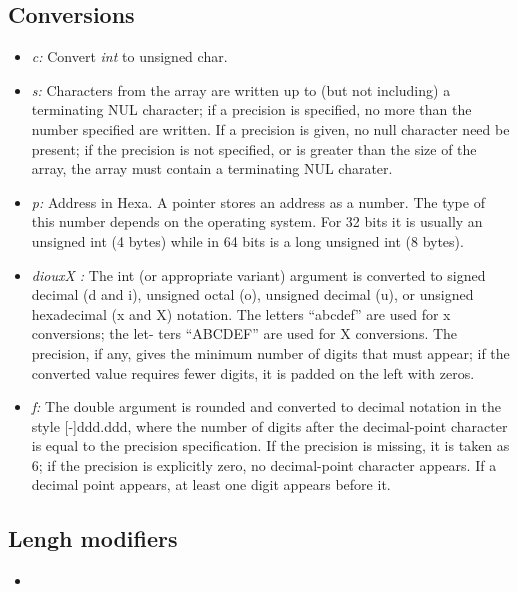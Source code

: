 \documentclass[12pt]{article}
\begin{document}
\subsection{Conversions}
\begin{itemize}
\item \textit{c:} Convert \textit{int} to unsigned {char}.
\item \textit{s:} Characters from the array are written up to (but not
             including) a terminating NUL character; if a precision is specified, no more
             than the number specified are written.  If a precision is given, no null
             character need be present; if the precision is not specified, or is greater
             than the size of the array, the array must contain a terminating NUL charater.
\item \textit{p:} Address in Hexa. A pointer stores an address as a number. The type of this number depends on the operating system. For 32 bits it is usually an unsigned int (4 bytes) while in 64 bits is a long unsigned int (8 bytes).  
\item \textit{ diouxX :} The int (or appropriate variant) argument is converted to signed decimal (d and i), unsigned octal (o), unsigned decimal (u), or unsigned hexadecimal (x
             and X) notation.  The letters ``abcdef'' are used for x conversions; the let-
             ters ``ABCDEF'' are used for X conversions.  The precision, if any, gives the
             minimum number of digits that must appear; if the converted value requires
             fewer digits, it is padded on the left with zeros.
            
\item \textit{f:} The double argument is rounded and converted to decimal notation in the style
             [-]ddd.ddd, where the number of digits after the decimal-point character is
             equal to the precision specification.  If the precision is missing, it is
             taken as 6; if the precision is explicitly zero, no decimal-point character
             appears.  If a decimal point appears, at least one digit appears before it.
\end{itemize}

\subsection{Lengh modifiers}

\begin{itemize}
\item

\end{itemize}
\end{document}
